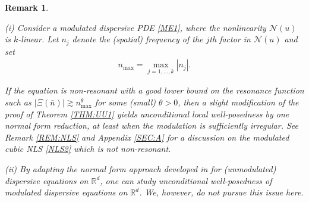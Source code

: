 \documentclass[letterpaper, 11pt,  reqno]{amsart}
\newtheorem{remark}[theorem]{Remark}
\newcommand{\1}{\hspace{0.5mm}\text{I}\hspace{0.5mm}}
\newcommand{\noi}{\noindent}
\newcommand{\R}{\mathbb{R}}
\newcommand{\ta}{\theta}
\newcommand{\ges}{\gtrsim}
\newcommand{\NN}{\mathcal{N}}
\numberwithin{equation}{section}
\numberwithin{theorem}{section}
\begin{document}
\begin{remark}\label{REM:NF9}
\rm


(i) 
Consider 
a modulated dispersive PDE \eqref{ME1}, 
where the nonlinearity $\NN(u)$
is $k$-linear.
Let $n_j$ denote the (spatial) frequency 
of the $j$th factor in $\NN(u)$
and set 
\begin{align}
n_{\max} = \max_{j = 1, \dots, k} |n_j|.
\label{max1}
\end{align}

\noi
If the equation is {\it non-resonant}
with a good lower bound on the resonance function
such as  
$|\Xi(\bar n)|\ges n_{\max}^\ta$
for some (small) $\ta > 0$, 
then
a slight modification of the proof of Theorem \ref{THM:UU1}
yields 
unconditional local well-posedness
by one normal form reduction, 
at least when the modulation is sufficiently irregular.
See Remark \ref{REM:NLS}
and Appendix \ref{SEC:A}
for a discussion on the modulated cubic NLS \eqref{NLS2}
 which is {\it not} non-resonant.




\smallskip

\noi
(ii) 
By adapting the normal form approach 
developed in 
\cite{KOY, Ki2, FO, CLOZ}
for (unmodulated) dispersive equations on $\R^d$, 
one can study unconditional well-posedness of modulated 
dispersive equations on $\R^d$.
We, however, do not pursue this issue here.


\end{remark}
\end{document}
